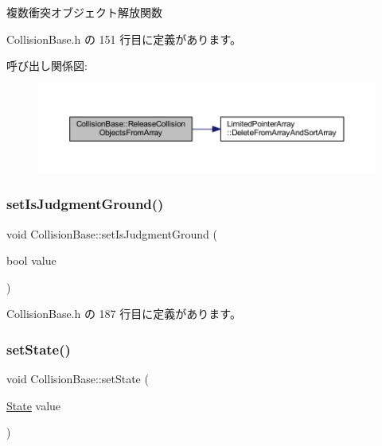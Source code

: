 複数衝突オブジェクト解放関数 



 Collision\+Base.\+h の 151 行目に定義があります。

呼び出し関係図\+:\nopagebreak
\begin{figure}[H]
\begin{center}
\leavevmode
\includegraphics[width=350pt]{class_collision_base_a46bbb58a0dd818fc172f34462b1d5b08_cgraph}
\end{center}
\end{figure}
\mbox{\label{class_collision_base_a231cb5c715701444db63db030c06b694}} 
\subsubsection{\texorpdfstring{set\+Is\+Judgment\+Ground()}{setIsJudgmentGround()}}
{\footnotesize\ttfamily void Collision\+Base\+::set\+Is\+Judgment\+Ground (\begin{DoxyParamCaption}\item[{bool}]{value }\end{DoxyParamCaption})\hspace{0.3cm}{\ttfamily [inline]}}



 Collision\+Base.\+h の 187 行目に定義があります。

\mbox{\label{class_collision_base_a01db1e666b8e71c33969e9ab6bbc724e}} 
\subsubsection{\texorpdfstring{set\+State()}{setState()}}
{\footnotesize\ttfamily void Collision\+Base\+::set\+State (\begin{DoxyParamCaption}\item[{\mbox{\hyperlink{class_collision_base_a4dd1ed00099a19c0176913af93c4e365}{State}}}]{value }\end{DoxyParamCaption})\hspace{0.3cm}{\ttfamily [inline]}}



